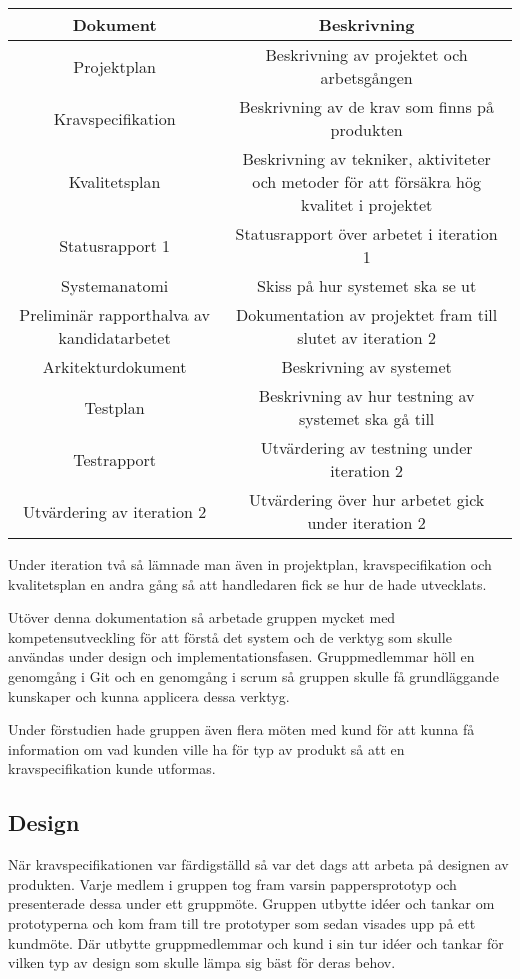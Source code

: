 \documentclass[a4paper,10pt]{article}
\begin{document}
\begin{center}
\begin{tabular}{|c|c|}
\hline
\textbf{Dokument} & \textbf{Beskrivning} \\
\hline
Projektplan & Beskrivning av projektet och arbetsgången \\
\hline
Kravspecifikation & Beskrivning av de krav som finns på produkten \\
\hline
Kvalitetsplan & Beskrivning av tekniker, aktiviteter och metoder för att försäkra hög kvalitet i projektet \\
\hline
Statusrapport 1 & Statusrapport över arbetet i iteration 1 \\
\hline
Systemanatomi & Skiss på hur systemet ska se ut \\
\hline
Preliminär rapporthalva av kandidatarbetet & Dokumentation av projektet fram till slutet av iteration 2 \\
\hline
Arkitekturdokument & Beskrivning av systemet \\
\hline
Testplan & Beskrivning av hur testning av systemet ska gå till \\
\hline
Testrapport & Utvärdering av testning under iteration 2 \\
\hline
Utvärdering av iteration 2 & Utvärdering över hur arbetet gick under iteration 2 \\
\hline
\end{tabular}
\end{center}

Under iteration två så lämnade man även in projektplan, kravspecifikation och kvalitetsplan en andra gång så att handledaren fick se hur de hade utvecklats.

Utöver denna dokumentation så arbetade gruppen mycket med kompetensutveckling för att förstå det system och de verktyg som skulle användas under design och implementationsfasen. Gruppmedlemmar höll en genomgång i Git och en genomgång i scrum så gruppen skulle få grundläggande kunskaper och kunna applicera dessa verktyg. 

Under förstudien hade gruppen även flera möten med kund för att kunna få information om vad kunden ville ha för typ av produkt så att en kravspecifikation kunde utformas.

\subsection{Design}
När kravspecifikationen var färdigställd så var det dags att arbeta på designen av produkten. Varje medlem i gruppen tog fram varsin pappersprototyp och presenterade dessa under ett gruppmöte. Gruppen utbytte idéer och tankar om prototyperna och kom fram till tre prototyper som sedan visades upp på ett kundmöte. Där utbytte gruppmedlemmar och kund i sin tur idéer och tankar för vilken typ av design som skulle lämpa sig bäst för deras behov.
\end{document}
